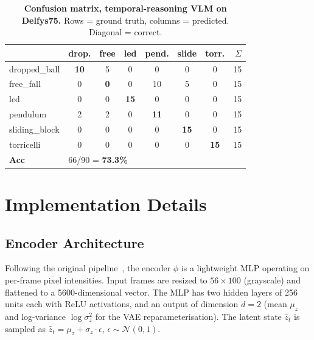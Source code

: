 \documentclass[runningheads]{llncs}
\begin{document}
\begin{table}[h]
  \centering
  \caption{\textbf{Confusion matrix, temporal-reasoning VLM on Delfys75.}
  Rows = ground truth, columns = predicted.  Diagonal = correct.}
  \label{tab:vlm_conf_temporal}
  \footnotesize
  \begin{tabular}{@{}l|cccccc|r@{}}
    \toprule
    & \textbf{drop.} & \textbf{free} & \textbf{led}
      & \textbf{pend.} & \textbf{slide} & \textbf{torr.} & $\Sigma$ \\
    \midrule
    dropped\_ball & \textbf{10} &  5 & 0 &  0 &  0 & 0 & 15 \\
    free\_fall    &  0 &  \textbf{0} & 0 & 10 &  5 & 0 & 15 \\
    led           &  0 &  0 & \textbf{15} &  0 &  0 & 0 & 15 \\
    pendulum      &  2 &  2 & 0 & \textbf{11} &  0 & 0 & 15 \\
    sliding\_block &  0 &  0 & 0 &  0 & \textbf{15} & 0 & 15 \\
    torricelli    &  0 &  0 & 0 &  0 &  0 & \textbf{15} & 15 \\
    \midrule
    \textbf{Acc} & \multicolumn{6}{l}{66/90 = \textbf{73.3\%}} & \\
    \bottomrule
  \end{tabular}
\end{table}


\section{Implementation Details}
\label{app:impl}

\subsection{Encoder Architecture}
\label{app:encoder}

Following the original pipeline~\cite{garcia2025learning}, the encoder
$\phi$ is a lightweight MLP operating on per-frame pixel intensities.
Input frames are resized to $56 \times 100$ (grayscale) and flattened to a
5600-dimensional vector. The MLP has two hidden layers of 256 units each
with ReLU activations, and an output of dimension $d = 2$ (mean $\mu_z$
and log-variance $\log\sigma^2_z$ for the VAE reparameterisation). The
latent state $\hat{z}_t$ is sampled as
$\hat{z}_t = \mu_z + \sigma_z \cdot \epsilon$, $\epsilon \sim \mathcal{N}(0,1)$.
\end{document}
